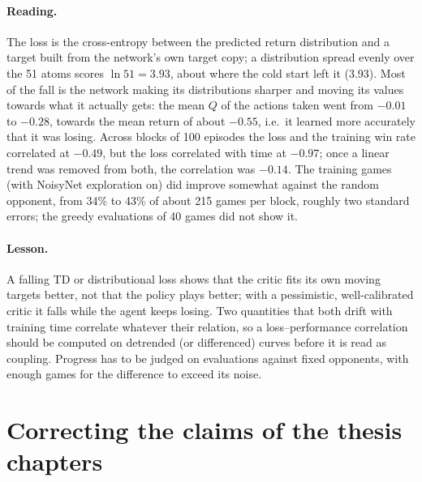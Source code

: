 \paragraph{Reading.} The loss is the cross-entropy between the predicted return distribution and
a target built from the network's own target copy; a distribution spread evenly over the 51 atoms
scores $\ln 51 = 3.93$, about where the cold start left it (3.93). Most of the fall is the
network making its distributions sharper and moving its values towards what it actually gets:
the mean $Q$ of the actions taken went from $-0.01$ to $-0.28$, towards the mean return of about
$-0.55$, i.e.\ it learned more accurately that it was losing. Across blocks of 100 episodes the
loss and the training win rate correlated at $-0.49$, but the loss correlated with time at
$-0.97$; once a linear trend was removed from both, the correlation was $-0.14$. The training
games (with NoisyNet exploration on) did improve somewhat against the random opponent, from 34\%
to 43\% of about 215 games per block, roughly two standard errors; the greedy evaluations of 40
games did not show it.

\paragraph{Lesson.} A falling TD or distributional loss shows that the critic fits its own
moving targets better, not that the policy plays better; with a pessimistic, well-calibrated
critic it falls while the agent keeps losing. Two quantities that both drift with training time
correlate whatever their relation, so a loss--performance correlation should be computed on
detrended (or differenced) curves before it is read as coupling. Progress has to be judged on
evaluations against fixed opponents, with enough games for the difference to exceed its noise.

\section{Correcting the claims of the thesis chapters}

